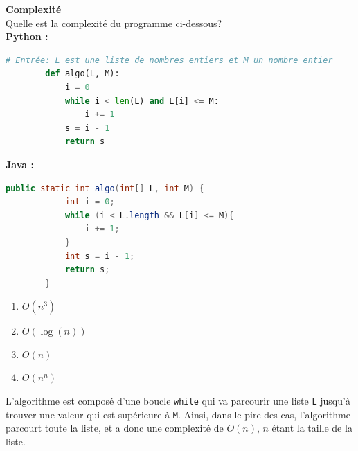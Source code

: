 \begin{Exercice}[10 minutes] \textbf{Complexité} \\
    Quelle est la complexité du programme ci-dessous?\\
    \textbf{Python :}
    \begin{lstlisting}[language=Python]
        # Entrée: L est une liste de nombres entiers et M un nombre entier
        def algo(L, M):
            i = 0
            while i < len(L) and L[i] <= M:
                i += 1
            s = i - 1
            return s
    \end{lstlisting}
    
    \textbf{Java :}
    \begin{lstlisting}[language=Java]
        public static int algo(int[] L, int M) {
            int i = 0;
            while (i < L.length && L[i] <= M){
                i += 1;
            }
            int s = i - 1;
            return s;
        }
    \end{lstlisting}

    \begin{enumerate}
        \item $O(n^3)$
        \item $O(\log(n))$
        \item $O(n)$
        \item $O(n^n)$
    \end{enumerate}

    \begin{solution}
    L'algorithme est composé d'une boucle \lstinline{while} qui va parcourir une liste \lstinline{L} jusqu'à trouver une valeur qui est supérieure à \lstinline{M}. Ainsi, dans le pire des cas, l'algorithme parcourt toute la liste, et a donc une complexité de $O(n)$, $n$ étant la taille de la liste.
    \end{solution}
\end{Exercice}
